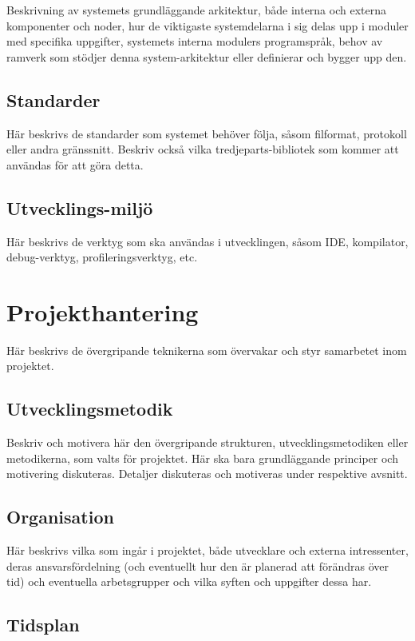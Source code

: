 \documentclass[a4paper,12pt,oneside,final]{extbook}
\begin{document}
Beskrivning av systemets grundläggande arkitektur, både interna och
externa komponenter och noder, hur de viktigaste systemdelarna i sig
delas upp i moduler med specifika uppgifter, systemets interna
modulers programspråk, behov av ramverk som stödjer denna
system-arkitektur eller definierar och bygger upp den.

\section{Standarder}

Här beskrivs de standarder som systemet behöver följa, såsom
filformat, protokoll eller andra gränssnitt. Beskriv också vilka
tredjeparts-bibliotek som kommer att användas för att göra detta.

\section{Utvecklings-miljö}

Här beskrivs de verktyg som ska användas i utvecklingen, såsom IDE, kompilator, debug-verktyg, profileringsverktyg, etc.

\chapter{Projekthantering}

Här beskrivs de övergripande teknikerna som övervakar och styr
samarbetet inom projektet.

\section{Utvecklingsmetodik}

Beskriv och motivera här den övergripande strukturen,
utvecklingsmetodiken eller metodikerna, som valts för projektet. Här
ska bara grundläggande principer och motivering diskuteras. Detaljer
diskuteras och motiveras under respektive avsnitt.

\section{Organisation}

Här beskrivs vilka som ingår i projektet, både utvecklare och externa
intressenter, deras ansvarsfördelning (och eventuellt hur den är
planerad att förändras över tid) och eventuella arbetsgrupper och
vilka syften och uppgifter dessa har.

\section{Tidsplan}
\end{document}
